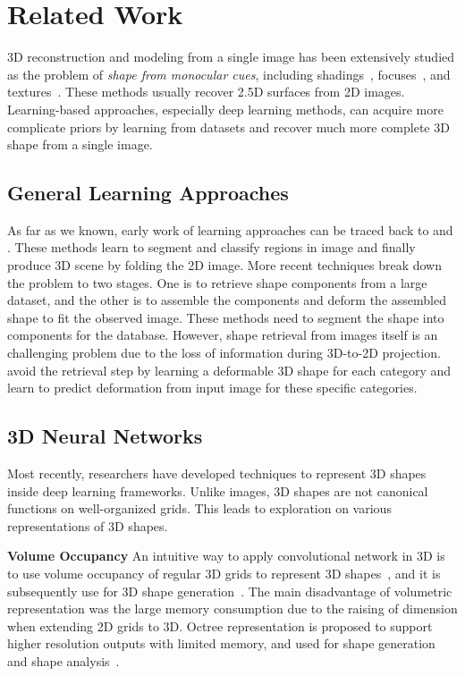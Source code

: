 \section{Related Work}
3D reconstruction and modeling from a single image has been extensively studied as the problem of \emph{shape from monocular cues}, including shadings~\cite{shapefromshadingsurvey}, focuses~\cite{shapefromdf1,shapefromdf2}, and textures~\cite{Aloimonos1988}. 
These methods usually recover 2.5D surfaces from 2D images. 
Learning-based approaches, especially deep learning methods, can acquire more complicate priors by learning from datasets and recover much more complete 3D shape from a single image.
 
\subsection{General Learning Approaches}
As far as we known, early work of learning approaches can be traced back to \cite{Hoiem2007} and \cite{learn3D2007}. These methods learn to segment and classify regions in image and finally produce 3D scene by folding the 2D image.
%
More recent techniques break down the problem to two stages\cite{Su:2014,jointimgshape}. One is to retrieve shape components from a large dataset, and the other is to assemble the components and deform the assembled shape to fit the observed image. These methods need to segment the shape into components for the database.
%
However, shape retrieval from images itself is an challenging problem due to the loss of information during 3D-to-2D projection. 
\cite{imgrecon15} avoid the retrieval step by learning a deformable 3D shape for each category and learn to predict deformation from input image for these specific categories.
%
\subsection{3D Neural Networks}
Most recently, researchers have developed techniques to represent 3D shapes inside deep learning frameworks.%
Unlike images, 3D shapes are not canonical functions on well-organized grids. 
This leads to exploration on various representations of 3D shapes.

\noindent\textbf{Volume Occupancy} 
An intuitive way to apply convolutional network in 3D is to use volume occupancy of regular 3D grids to represent 3D shapes~\cite{3dshapenet}, and it is subsequently use for 3D shape generation~\cite{3DR2N2,learnobj}.
%
The main disadvantage of volumetric representation was the large memory consumption due to the raising of dimension when extending 2D grids to 3D. 
Octree representation is proposed to support higher resolution outputs with limited memory, and used for shape generation~\cite{octreegen} and shape analysis~\cite{ocnn}.

